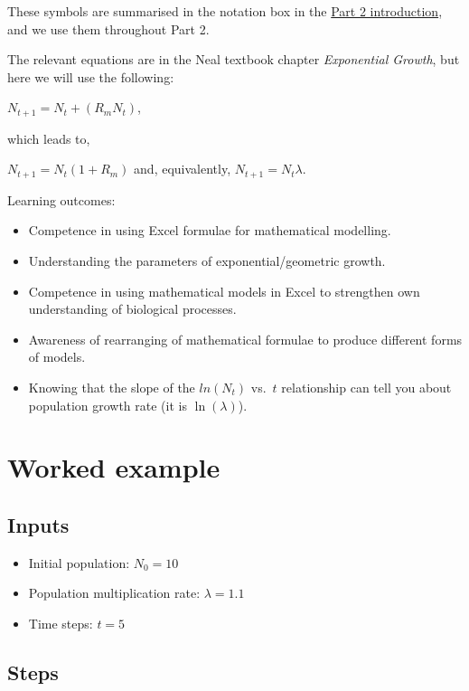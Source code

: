 \documentclass[
  a4paper]{book}
\providecommand{\tightlist}{%
  \setlength{\itemsep}{0pt}\setlength{\parskip}{0pt}}
\begin{document}
These symbols are summarised in the notation box in the \hyperref[part-2]{Part 2 introduction}, and we use them throughout Part 2.

The relevant equations are in the Neal textbook chapter \emph{Exponential Growth}, but here we will use the following:

\(N_{t+1} = N_t + (R_m N_t)\),

which leads to,

\(N_{t+1} = N_t (1 + R_m)\) and, equivalently, \(N_{t+1} = N_t \lambda\).

Learning outcomes:

\begin{itemize}
\tightlist
\item
  Competence in using Excel formulae for mathematical modelling.
\item
  Understanding the parameters of exponential/geometric growth.
\item
  Competence in using mathematical models in Excel to strengthen own understanding of biological processes.
\item
  Awareness of rearranging of mathematical formulae to produce different forms of models.
\item
  Knowing that the slope of the \(ln(N_t)\) vs.~\(t\) relationship can tell you about population growth rate (it is \(\ln(\lambda)\)).
\end{itemize}

\section{Worked example}\label{worked-example-1}

\subsection{Inputs}\label{inputs-1}

\begin{itemize}
\tightlist
\item
  Initial population: \(N_0 = 10\)
\item
  Population multiplication rate: \(\lambda = 1.1\)
\item
  Time steps: \(t = 5\)
\end{itemize}

\subsection{Steps}\label{steps-1}
\end{document}
